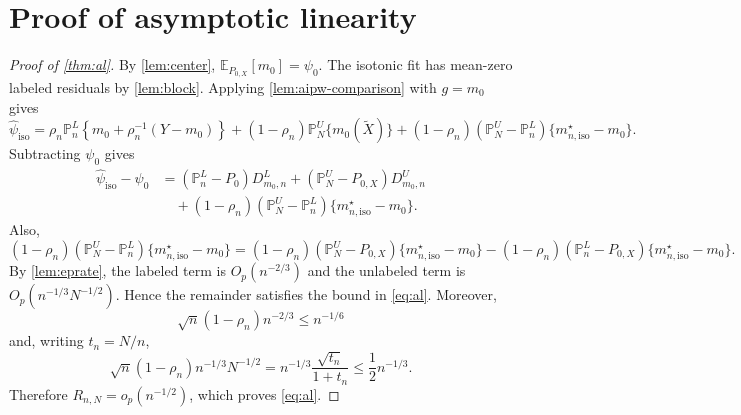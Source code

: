 \documentclass{article}
\theoremstyle{plain}
\theoremstyle{definition}
\newcommand{\E}{\mathbb{E}}
\newcommand{\1}{\mathbbm{1}}
\newcommand{\rhon}{\rho_n}
\newcommand{\Pl}{\mathbb{P}^{L}_n}
\newcommand{\Pu}{\mathbb{P}^{U}_N}
\newcommand{\Px}{P_{0,X}}
\begin{document}
\section{Proof of asymptotic linearity}
\label{app:al}

\begin{proof}[Proof of \cref{thm:al}]

By \cref{lem:center}, \(\E_{\Px}[m_0]=\psi_0\). The isotonic fit has mean-zero labeled residuals by \cref{lem:block}. Applying \cref{lem:aipw-comparison} with \(g=m_0\) gives
\[
\widehat{\psi}_{\mathrm{iso}}
=
\rhon \Pl\left\{m_0+\rhon^{-1}(Y-m_0)\right\}
+
(1-\rhon)\Pu\{m_0(\widetilde X)\}
+
(1-\rhon)(\Pu-\Pl)\{m_{n,\mathrm{iso}}^\star-m_0\}.
\]
Subtracting \(\psi_0\) gives
\[
\begin{aligned}
\widehat{\psi}_{\mathrm{iso}}-\psi_0
&=
(\Pl-P_0)D_{m_0,n}^L
+
(\Pu-\Px)D_{m_0,n}^U\\
&\quad +
(1-\rhon)(\Pu-\Pl)\{m_{n,\mathrm{iso}}^\star-m_0\}.
\end{aligned}
\]
Also,
\[
(1-\rhon)(\Pu-\Pl)\{m_{n,\mathrm{iso}}^\star-m_0\}
=
(1-\rhon)(\Pu-\Px)\{m_{n,\mathrm{iso}}^\star-m_0\}
-
(1-\rhon)(\Pl-\Px)\{m_{n,\mathrm{iso}}^\star-m_0\}.
\]
By \cref{lem:eprate}, the labeled term is \(O_p(n^{-2/3})\) and the unlabeled term is \(O_p(n^{-1/3}N^{-1/2})\). Hence the remainder satisfies the bound in \cref{eq:al}. Moreover,
\[
\sqrt n(1-\rhon)n^{-2/3}\le n^{-1/6}
\]
and, writing \(t_n=N/n\),
\[
\sqrt n(1-\rhon)n^{-1/3}N^{-1/2}
=
n^{-1/3}\frac{\sqrt{t_n}}{1+t_n}
\le \frac12n^{-1/3}.
\]
Therefore \(R_{n,N}=o_p(n^{-1/2})\), which proves \cref{eq:al}.
\end{proof}
\end{document}
